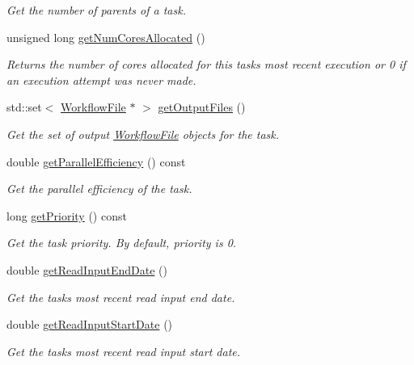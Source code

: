 \begin{DoxyCompactItemize}
\begin{DoxyCompactList}\small\item\em Get the number of parents of a task. \end{DoxyCompactList}\item 
unsigned long \hyperlink{classwrench_1_1_workflow_task_a0c897ccd9bf60ae8e30ad28d99e573f9}{get\+Num\+Cores\+Allocated} ()
\begin{DoxyCompactList}\small\item\em Returns the number of cores allocated for this task\textquotesingle{}s most recent execution or 0 if an execution attempt was never made. \end{DoxyCompactList}\item 
std\+::set$<$ \hyperlink{classwrench_1_1_workflow_file}{Workflow\+File} $\ast$ $>$ \hyperlink{classwrench_1_1_workflow_task_ade05bf520e4cda9a4d7aeaa8ffaa5855}{get\+Output\+Files} ()
\begin{DoxyCompactList}\small\item\em Get the set of output \hyperlink{classwrench_1_1_workflow_file}{Workflow\+File} objects for the task. \end{DoxyCompactList}\item 
double \hyperlink{classwrench_1_1_workflow_task_ab7e3113ba73aebc6e2776a6e56984662}{get\+Parallel\+Efficiency} () const
\begin{DoxyCompactList}\small\item\em Get the parallel efficiency of the task. \end{DoxyCompactList}\item 
long \hyperlink{classwrench_1_1_workflow_task_a330d0b94f3958a6542ba8ce033448197}{get\+Priority} () const
\begin{DoxyCompactList}\small\item\em Get the task priority. By default, priority is 0. \end{DoxyCompactList}\item 
double \hyperlink{classwrench_1_1_workflow_task_a15bbd1fca442b459073164b52dcc44b0}{get\+Read\+Input\+End\+Date} ()
\begin{DoxyCompactList}\small\item\em Get the task\textquotesingle{}s most recent read input end date. \end{DoxyCompactList}\item 
double \hyperlink{classwrench_1_1_workflow_task_a752f0e9cf1bcab72e41de185931dbf9a}{get\+Read\+Input\+Start\+Date} ()
\begin{DoxyCompactList}\small\item\em Get the task\textquotesingle{}s most recent read input start date. \end{DoxyCompactList}\item 

\end{DoxyCompactItemize}
